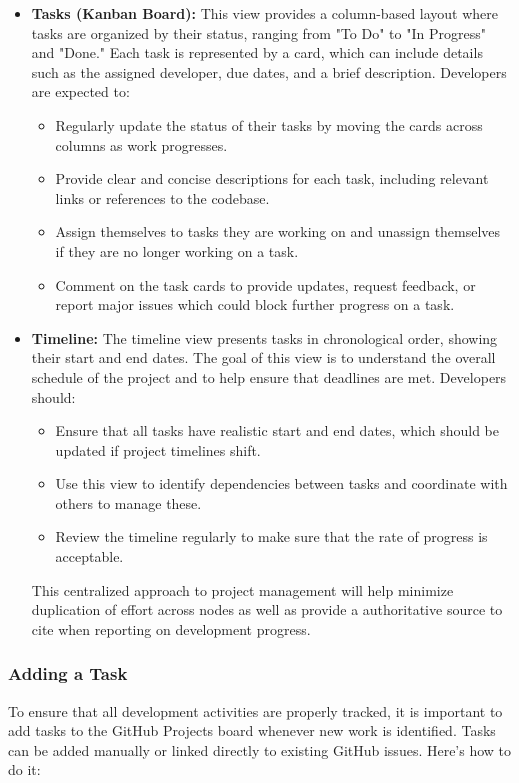 \documentclass{ol-softwaremanual}
\begin{document}
\begin{itemize}
\item \textbf{Tasks (Kanban Board):} This view provides a column-based layout where tasks are organized by their status, ranging from "To Do" to "In Progress" and "Done." Each task is represented by a card, which can include details such as the assigned developer, due dates, and a brief description. Developers are expected to:
\begin{itemize}
\item Regularly update the status of their tasks by moving the cards across columns as work progresses.
\item Provide clear and concise descriptions for each task, including relevant links or references to the codebase.
\item Assign themselves to tasks they are working on and unassign themselves if they are no longer working on a task.
\item Comment on the task cards to provide updates, request feedback, or report major issues which could block further progress on a task.
\end{itemize}
\item \textbf{Timeline:} The timeline view presents tasks in chronological order, showing their start and end dates. The goal of this view is to understand the overall schedule of the project and to help ensure that deadlines are met. Developers should:
\begin{itemize}
    \item Ensure that all tasks have realistic start and end dates, which should be updated if project timelines shift.
    \item Use this view to identify dependencies between tasks and coordinate with others to manage these.
    \item Review the timeline regularly to make sure that the rate of progress is acceptable.
\end{itemize}
This centralized approach to project management will help minimize duplication
of effort across nodes as well as provide a authoritative source to cite when
reporting on development progress.

\end{itemize}

\subsubsection{Adding a Task}

To ensure that all development activities are properly tracked, it is important to add tasks to the GitHub Projects board whenever new work is identified. Tasks can be added manually or linked directly to existing GitHub issues. Here's how to do it:
\end{document}

